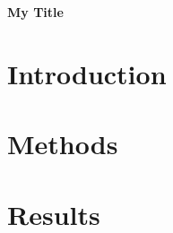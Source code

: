 \documentclass{article}
\date{}
\begin{document}
\begin{flushleft}
{\Large
\textbf{My Title}
}
\end{flushleft}




\section{Introduction}






\section{Methods}





\section{Results}
\end{document}
